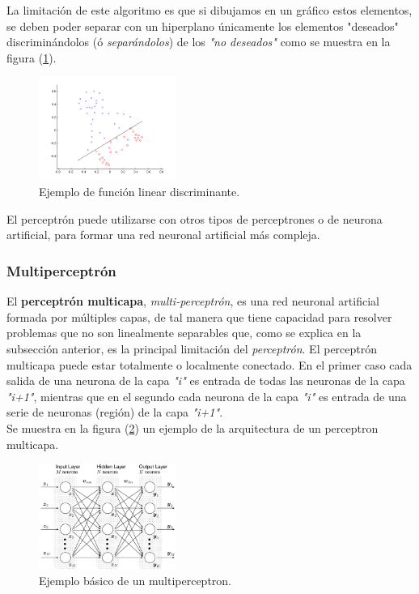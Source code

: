 \documentclass[osajnl,twocolumn,showpacs,superscriptaddress,10pt]{revtex4-1} %
\begin{document}
La limitación de este algoritmo es que si dibujamos en un gráfico estos elementos, se deben poder separar con un hiperplano únicamente los elementos "deseados" discriminándolos (ó \textit{separándolos}) de los \textit{"no deseados"} como se muestra en la figura (\ref{figure:linear_example}).

\begin{figure}[H]
    \centering
    \includegraphics[width=0.4\textwidth]{theory/linear}
    \caption{Ejemplo de función linear discriminante.}
    \label{figure:linear_example}
\end{figure}

El perceptrón puede utilizarse con otros tipos de perceptrones o de neurona artificial, para formar una red neuronal artificial más compleja.

\subsubsection{Multiperceptrón}

El \textbf{perceptrón multicapa}, \textit{multi-perceptrón}, es una red neuronal artificial formada por múltiples capas, de tal manera que tiene capacidad para resolver problemas que no son linealmente separables que, como se explica en la subsección anterior, es la principal limitación del \textit{perceptrón}. El perceptrón multicapa puede estar totalmente o localmente conectado. En el primer caso cada salida de una neurona de la capa \textit{"i"} es entrada de todas las neuronas de la capa \textit{"i+1"}, mientras que en el segundo cada neurona de la capa \textit{"i"} es entrada de una serie de neuronas (región) de la capa \textit{"i+1"}. \\

Se muestra en la figura (\ref{figure:multiperceptron_example}) un ejemplo de la arquitectura de un perceptron multicapa.

\begin{figure}[H]
    \centering
    \includegraphics[width=0.4\textwidth]{theory/multiperceptron}
    \caption{Ejemplo básico de un multiperceptron.}
    \label{figure:multiperceptron_example}
\end{figure}
\end{document}
